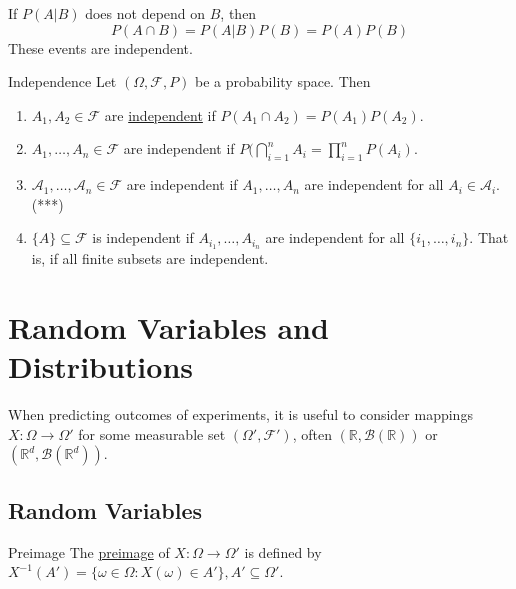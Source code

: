 \documentclass{article}
\newcommand{\R}{\mathbb{R}}
\begin{document}
	
	If $P(A|B)$ does not depend on $B$, then $$P(A\cap B)=P(A|B)P(B)=P(A)P(B)$$
	These events are independent.
	\begin{mydef}{Independence}{}
		Let $(\Omega, \mathcal{F}, P)$ be a probability space. Then
		\begin{enumerate}[label=(\roman*)]
			\item $A_1, A_2\in\mathcal{F}$ are \underline{independent} if $P(A_1\cap A_2)=P(A_1)P(A_2)$.
			
			\item $A_1, \dots, A_n\in\mathcal{F}$ are independent if $P(\bigcap_{i=1}^{n}A_i=\prod_{i=1}^{n}P(A_i)$.
			
			\item $\mathcal{A}_1, \dots, \mathcal{A}_n\in\mathcal{F}$ are independent if $A_1, \dots, A_n$ are independent for all $A_i\in\mathcal{A}_i$. (***)
			
			\item $\{A\}\subseteq\mathcal{F}$ is independent if $A_{i_1}, \dots, A_{i_n}$ are independent for all $\{i_1, \dots, i_n\}$. That is, if all finite subsets are independent.
		\end{enumerate}
	\end{mydef}
	
	\newpage
	\section{Random Variables and Distributions}
	When predicting outcomes of experiments, it is useful to consider mappings $X : \Omega\to\Omega'$ for some measurable set $(\Omega', \mathcal{F}')$, often $(\R, \mathcal{B}(\R))$ or $(\R^d, \mathcal{B}(\R^d))$.
	
	\subsection{Random Variables}
	\begin{mydef}{Preimage}{}
		The \underline{preimage} of $X : \Omega\to\Omega'$ is defined by $X^{-1}(A')=\{\omega\in\Omega : X(\omega)\in A'\}, A'\subseteq\Omega'$.
	\end{mydef}
	
\end{document}

